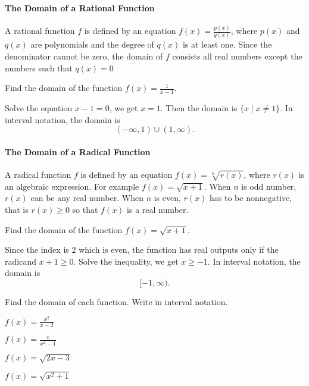 
\paragraph*{The Domain of a Rational Function}
	A rational function $f$ is defined by an equation $f(x)=\frac{p(x)}{q(x)}$, where $p(x)$ and $q(x)$ are polynomials and the degree of $q(x)$ is at least one. Since the denominator cannot be zero, the domain of $f$ consists all real numbers except the numbers such that $q(x)=0$

	\begin{example}
		Find the domain of the function $f(x)=\frac{1}{x-1}$.
	\end{example}
	\begin{solution}
		Solve the equation $x-1=0$, we get $x=1$. Then the domain is $\{x\mid x\neq 1\}$. In interval notation, the domain is
		\[(-\infty, 1)\cup (1,\infty).\]
	\end{solution}

\paragraph*{The Domain of a Radical Function}
	A radical function $f$ is defined by an equation $f(x)=\sqrt[n]{r(x)}$, where $r(x)$ is an algebraic expression.  For example $f(x)=\sqrt{x+1}$. When $n$ is odd number, $r(x)$ can be any real number.  When $n$ is even, $r(x)$ has to be nonnegative, that is $r(x)\geq 0$ so that $f(x)$ is a real number.

	\begin{example}
		Find the domain of the function $f(x)=\sqrt{x+1}$.
	\end{example}
	\begin{solution}Since the index is $2$ which is even, the function has real outputs only if the radicand $x+1\geq 0$.
		Solve the inequality, we get $x\geq -1$. In interval notation, the domain is
		\[[-1,\infty).\]
	\end{solution}

\newpage

\begin{exercise}
	Find the domain of each function. Write in interval notation.\\
	\begin{enumerate*}[label={(\arabic*)~~}]
		\item $f(x)=\frac{x^2}{x-2}$
		\item $f(x)=\frac{x}{x^2-1}$
		\item $f(x)=\sqrt{2x-3}$
		\item $f(x)=\sqrt{x^2+1}$\hfill\null
	\end{enumerate*}
\end{exercise}

